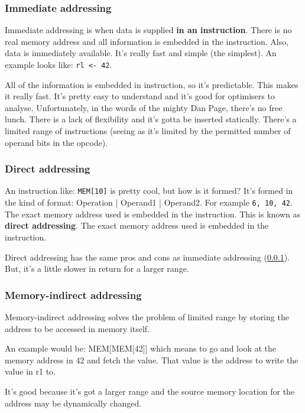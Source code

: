 \documentclass[11pt,a4paper,titlepage,dvipsnames,cmyk]{scrartcl}
\begin{document}
\subsubsection{Immediate addressing}%
\label{ssub:immediate}
Immediate addressing is when data is supplied \textbf{in an instruction}.
There is no real memory address and all information is embedded in the
instruction. Also, data is immediately available. It's really fast and
simple (the simplest). An example looks like: \lstinline|rl <- 42|.

All of the information is embedded in instruction, so it's predictable.
This makes it really fast. It's pretty easy to understand and it's good
for optimisers to analyse. Unfortunately, in the words of the mighty Dan
Page, there's no free lunch. There is a lack of flexibility and it's gotta
be inserted statically. There's a limited range of instructions (seeing as
it's limited by the permitted number of operand bits in the opcode).

\subsubsection{Direct addressing}%
\label{ssub:direct}
An instruction like: \lstinline|MEM[10]| is pretty cool, but how is it
formed? It's formed in the kind of format: Operation | Operand1 |
Operand2. For example \lstinline|6, 10, 42|. The exact memory address used
is embedded in the instruction. This is known as \textbf{direct
addressing}. The exact memory address used is embedded in the instruction.

Direct addressing has the same pros and cons as immediate
addressing (\ref{ssub:immediate}). But, it's a little slower in return for
a larger range.

\subsubsection{Memory-indirect addressing}%
\label{ssub:memory-indirect}

Memory-indirect addressing solves the problem of limited range by storing
the address to be accessed in memory itself. 

An example would be: MEM[MEM[42]] which means to go and look at the memory
address in 42 and fetch the value. That value is the address to write the
value in r1 to.

It's good because it's got a larger range and the source memory location
for the address may be dynamically changed.
\end{document}
